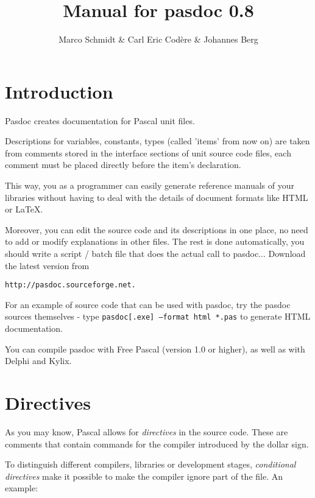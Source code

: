 \documentclass[11pt]{article}
\begin{document}
\title{Manual for pasdoc 0.8}
\author{Marco Schmidt \& Carl Eric Cod\`{e}re \& Johannes Berg}

\maketitle

\newpage

\tableofcontents

\newpage

\section{Introduction}

Pasdoc creates documentation for Pascal unit files.

Descriptions for variables, constants, types (called 'items' from now on) are 
taken from comments stored in the interface sections of unit source code files,
each comment must be placed directly before the item's declaration.

This way, you as a programmer can easily generate reference manuals of your
libraries without having to deal with the details of document formats like
HTML or \LaTeX.

Moreover, you can edit the source code and its descriptions in one
place, no need to add or modify explanations in other files.
The rest is done automatically, you should write a script / batch file that
does the actual call to pasdoc...
Download the latest version from
\begin{verbatim}
http://pasdoc.sourceforge.net.
\end{verbatim}
For an example of source code that can be used with pasdoc, try the pasdoc
sources themselves - type {\tt pasdoc[.exe] --format html *.pas} to generate HTML
documentation.

You can compile pasdoc with Free Pascal (version 1.0 or higher), as well
as with Delphi and Kylix. 

\section{Directives}

As you may know, Pascal allows for \emph{directives} in the source code.
These are comments that contain commands for the compiler introduced by the
dollar sign.

To distinguish different compilers, libraries or development stages,
\emph{conditional directives} make it possible to make the compiler ignore
part of the file.
An example:
\end{document}
